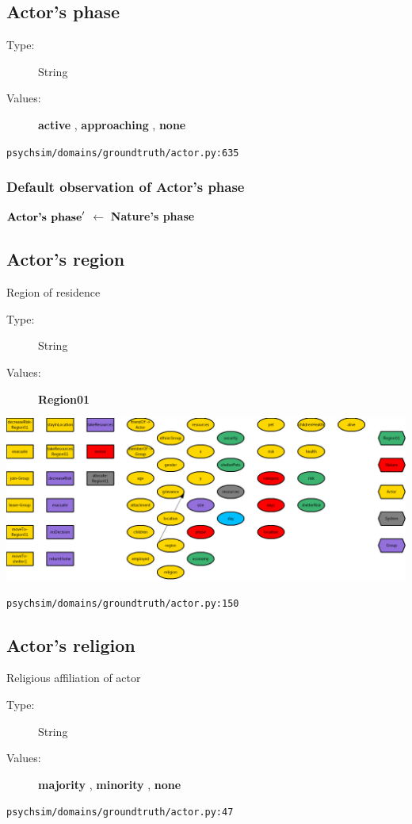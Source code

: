 \documentclass{article}%
\begin{document}
%
\subsection{Actor's phase}%
\label{subsec:Actor's phase}%
\begin{description}%
\item[Type:]%
String%
\item[Values:]%
\textbf{active}%
, %
\textbf{approaching}%
, %
\textbf{none}%
\end{description}%
\begin{flushleft}%
\verb|psychsim/domains/groundtruth/actor.py:635|%
\end{flushleft}%
\subsubsection{Default observation of Actor's phase}%
\label{ssubsec:Default observation of Actor's phase}%
\begin{flushleft}%
$\mbox{\textbf{Actor's phase}} '$%
$\leftarrow$%
\textbf{Nature's phase}%
\end{flushleft}

%
\subsection{Actor's region}%
\label{subsec:Actor's region}%
Region of residence%
\begin{description}%
\item[Type:]%
String%
\item[Values:]%
\textbf{Region01}%
\end{description}%
\includegraphics[width=\textwidth]{images/regionOfActor.png}%
\begin{flushleft}%
\verb|psychsim/domains/groundtruth/actor.py:150|%
\end{flushleft}

%
\subsection{Actor's religion}%
\label{subsec:Actor's religion}%
Religious affiliation of actor%
\begin{description}%
\item[Type:]%
String%
\item[Values:]%
\textbf{majority}%
, %
\textbf{minority}%
, %
\textbf{none}%
\end{description}%
\begin{flushleft}%
\verb|psychsim/domains/groundtruth/actor.py:47|%
\end{flushleft}
\end{document}
